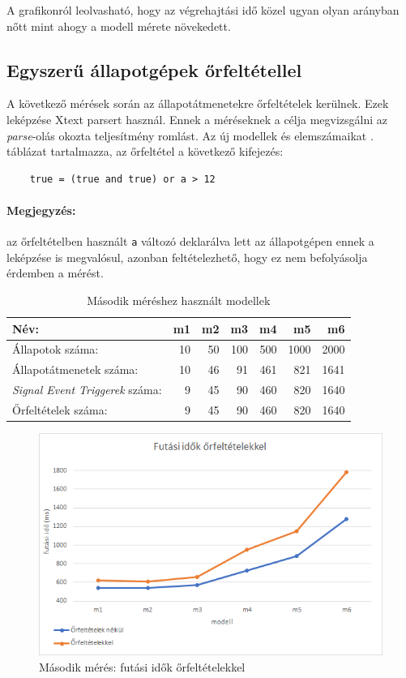 A grafikonról leolvasható, hogy az végrehajtási idő közel ugyan olyan arányban nőtt mint ahogy a modell mérete növekedett.

\subsection{Egyszerű állapotgépek őrfeltétellel}

A következő mérések során az állapotátmenetekre őrfeltételek kerülnek. Ezek leképzése Xtext parsert használ. Ennek a méréseknek a célja megvizsgálni az \emph{parse}-olás okozta teljesítmény romlást. Az új modellek és elemszámaikat . táblázat tartalmazza, az őrfeltétel a következő kifejezés:
\begin{lstlisting}
	true = (true and true) or a > 12
\end{lstlisting}

\paragraph{Megjegyzés:} az őrfeltételben használt \verb+a+ változó deklarálva lett az állapotgépen ennek a leképzése is megvalósul, azonban feltételezhető, hogy ez nem befolyásolja érdemben a mérést.

\begin{table}[H]
	\footnotesize
	\centering
	\begin{tabular}{ l r r r r r r}
		Név: & m1 & m2 & m3 & m4 & m5 & m6 \\ \hline
		Állapotok száma:  & 10 & 50 & 100 & 500 & 1000 & 2000 \\
		Állapotátmenetek száma: & 10 & 46 & 91 & 461 & 821 & 1641 \\
		\emph{Signal Event Triggerek} száma: & 9 & 45 & 90 & 460 & 820 & 1640 \\
		Őrfeltételek száma: & 9 & 45 & 90 & 460 & 820 & 1640
	\end{tabular}
	\caption{Második méréshez használt modellek}
	\label{table:meres2}
\end{table}

\begin{figure}[H]
	\centering
	\includegraphics[keepaspectratio, width=140mm]{figures/meres2.png}
	\caption{Második mérés: futási idők őrfeltételekkel}
	\label{fig:meres2}
\end{figure}

